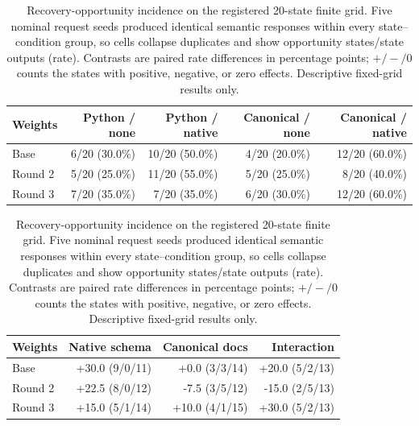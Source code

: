 \begin{table}[t]
\centering
\small
\caption{Recovery-opportunity incidence on the registered 20-state
finite grid. Five nominal request seeds produced identical semantic
responses within every state--condition group, so cells collapse
duplicates and show opportunity states/state outputs (rate).
Contrasts are paired rate differences in percentage points; $+/-/0$
counts the states with positive, negative, or zero effects. Descriptive
fixed-grid results only.}
\label{tab:trigger-incidence}
\begin{tabular}{lrrrr}
\toprule
Weights & Python / none & Python / native & Canonical / none & Canonical / native \\
\midrule
Base & 6/20 (30.0\%) & 10/20 (50.0\%) & 4/20 (20.0\%) & 12/20 (60.0\%) \\
Round 2 & 5/20 (25.0\%) & 11/20 (55.0\%) & 5/20 (25.0\%) & 8/20 (40.0\%) \\
Round 3 & 7/20 (35.0\%) & 7/20 (35.0\%) & 6/20 (30.0\%) & 12/20 (60.0\%) \\
\bottomrule
\end{tabular}

\vspace{3pt}
\begin{tabular}{lrrr}
\toprule
Weights & Native schema & Canonical docs & Interaction \\
\midrule
Base & +30.0 (9/0/11) & +0.0 (3/3/14) & +20.0 (5/2/13) \\
Round 2 & +22.5 (8/0/12) & -7.5 (3/5/12) & -15.0 (2/5/13) \\
Round 3 & +15.0 (5/1/14) & +10.0 (4/1/15) & +30.0 (5/2/13) \\
\bottomrule
\end{tabular}
\end{table}
